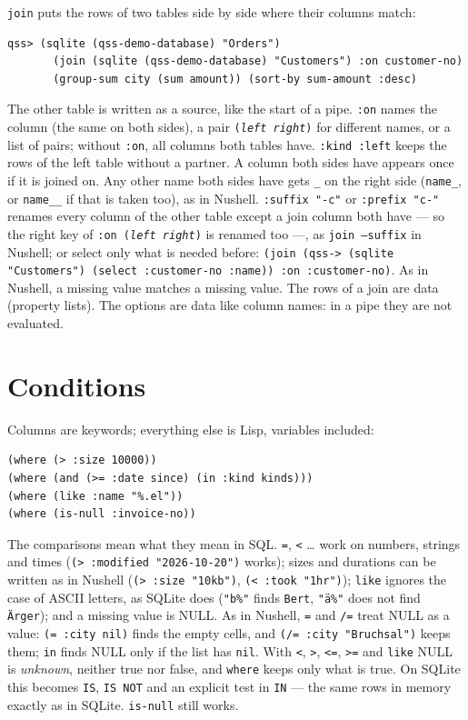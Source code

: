 \documentclass[
  paper=a4, fontsize=11pt, parskip=half, headings=small,
  toc=bibliography, numbers=noenddot, DIV=12
]{scrreprt}
\newcommand{\code}[1]{\texttt{#1}}
\begin{document}
\code{join} puts the rows of two tables side by side where their columns match:

\begin{Verbatim}
qss> (sqlite (qss-demo-database) "Orders")
       (join (sqlite (qss-demo-database) "Customers") :on customer-no)
       (group-sum city (sum amount)) (sort-by sum-amount :desc)
\end{Verbatim}

The other table is written as a source, like the start of a pipe. \code{:on}
names the column (the same on both sides), a pair \code{(\emph{left}
\emph{right})} for different names, or a list of pairs; without \code{:on},
all columns both tables have. \code{:kind :left} keeps the rows of the left
table without a partner. A column both sides have appears once if it is joined
on. Any other name both sides have gets \code{\_} on the right side
(\code{name\_}, or \code{name\_\_} if that is taken too), as in Nushell.
\code{:suffix "-c"} or \code{:prefix "c-"} renames every column of the other
table except a join column both have --- so the right key of
\code{:on (\emph{left} \emph{right})} is renamed too ---, as \code{join
--suffix} in Nushell; or select only what is needed before:
\code{(join (qss-> (sqlite "Customers") (select :customer-no :name)) :on :customer-no)}.
As in Nushell, a missing value matches a missing value. The rows of a join are data (property lists). The options are
data like column names: in a pipe they are not evaluated.

\section{Conditions}

Columns are keywords; everything else is Lisp, variables included:

\begin{lstlisting}
(where (> :size 10000))
(where (and (>= :date since) (in :kind kinds)))
(where (like :name "%.el"))
(where (is-null :invoice-no))
\end{lstlisting}

The comparisons mean what they mean in SQL. \code{=}, \code{<} \ldots{} work on
numbers, strings and times (\code{(> :modified "2026-10-20")} works); sizes and
durations can be written as in Nushell (\code{(> :size "10kb")},
\code{(< :took "1hr")}); \code{like} ignores the case of ASCII letters, as
SQLite does (\code{"b\%"} finds \code{Bert}, \code{"ä\%"} does not find
\code{Ärger}); and a missing value is NULL. As in Nushell, \code{=} and
\code{/=} treat NULL as a value: \code{(= :city nil)} finds the empty cells, and
\code{(/= :city "Bruchsal")} keeps them; \code{in} finds NULL only if the list
has \code{nil}. With \code{<}, \code{>}, \code{<=}, \code{>=} and \code{like}
NULL is \emph{unknown}, neither true nor false, and \code{where} keeps only
what is true. On SQLite this becomes \code{IS}, \code{IS NOT} and an explicit
test in \code{IN} --- the same rows in memory exactly as in SQLite.
\code{is-null} still works.
\end{document}
